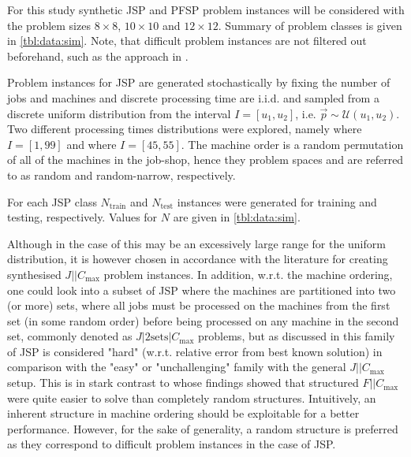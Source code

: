 \documentclass[smallextended]{svjour3}
\begin{document}
	
	
	For this study synthetic JSP and PFSP problem instances will be considered with the problem sizes $8\times8$,  $10\times10$ and $12\times12$. Summary of problem classes is given in \cref{tbl:data:sim}.
	Note, that difficult problem instances are not filtered out beforehand, such as the approach in \citet{Whitley}. 
	
	Problem instances for JSP are generated stochastically by fixing the number of jobs and machines and 
	discrete processing time are i.i.d. and sampled from a discrete uniform distribution from the interval $I=[u_1,u_2]$, i.e. $\vec{p}\sim \mathcal{U}(u_1,u_2)$. 
	Two different processing times distributions were explored, namely 
	  where $I=[1,99]$ and   where $I=[45,55]$.
	The machine order is a random permutation of all of the machines in the job-shop, hence they problem spaces    and   are referred to as random and random-narrow, respectively. 
	
	For each JSP class $N_{\text{train}}$  and $N_{\text{test}}$ instances were generated for training and testing, respectively. Values for $N$ are given in \cref{tbl:data:sim}. 
	
	Although in the case of   this may be an excessively large range for the uniform distribution, it is however chosen in accordance with the literature \citep{Demirkol98} for creating synthesised $J||C_{\max}$ problem instances. In addition, w.r.t. the machine ordering, one could look into a subset of JSP where the machines are partitioned into two (or more) sets, where all jobs must be processed on the machines from the first set (in some random order) before being processed on any machine in the second set, commonly denoted as $J|2\textrm{sets}|C_{\max}$ problems, but as discussed in \cite{orlib_swv} this family of JSP is considered "hard" (w.r.t. relative error from best known solution) in comparison with the "easy" or "unchallenging" family with the general $J||C_{\max}$ setup. %
	This is in stark contrast to \citet{Whitley} whose findings showed that structured $F||C_{\max}$ were quite easier to solve than completely random structures. 
	Intuitively, an inherent structure in machine ordering should be exploitable for a better performance.  However, for the sake of generality, a random structure is preferred as they correspond to difficult problem instances in the case of JSP. 
	
\end{document}
